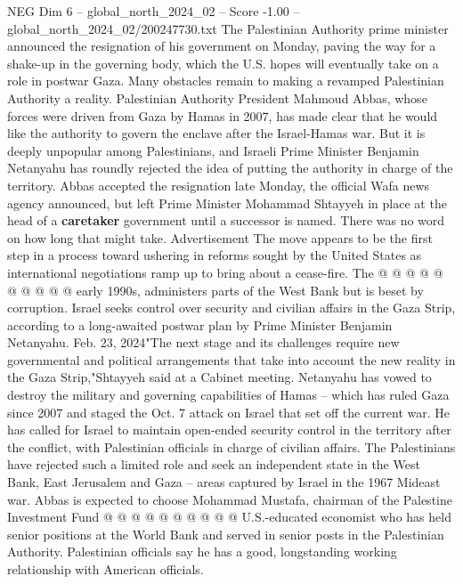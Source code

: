 \begin{textsample}{NEG Dim 6 – global\_north\_2024\_02 – Score -1.00 – global\_north\_2024\_02/200247730.txt}  \label{ex:f6_neg_280}
The Palestinian Authority prime minister announced the resignation of his government on Monday, paving the way for a shake-up in the governing body, which the U.S. hopes will eventually take on a role in postwar Gaza.
Many obstacles remain to making a revamped Palestinian Authority a reality.
Palestinian Authority President Mahmoud Abbas, whose forces were driven from Gaza by Hamas in 2007, has made clear that he would like the authority to govern the enclave after the Israel-Hamas war.
But it is deeply unpopular among Palestinians, and Israeli Prime Minister Benjamin Netanyahu has roundly rejected the idea of putting the authority in charge of the territory.
Abbas accepted the resignation late Monday, the official Wafa news agency announced, but left Prime Minister Mohammad Shtayyeh in place at the head of a \textbf{caretaker} government until a successor is named.
There was no word on how long that might take.
Advertisement The move appears to be the first step in a process toward ushering in reforms sought by the United States as international negotiations ramp up to bring about a cease-fire.
The @ @ @ @ @ @ @ @ @ @ early 1990s, administers parts of the West Bank but is beset by corruption.
Israel seeks control over security and civilian affairs in the Gaza Strip, according to a long-awaited postwar plan by Prime Minister Benjamin Netanyahu.
Feb. 23, 2024"The next stage and its challenges require new governmental and political arrangements that take into account the new reality in the Gaza Strip,"Shtayyeh said at a Cabinet meeting.
Netanyahu has vowed to destroy the military and governing capabilities of Hamas -- which has ruled Gaza since 2007 and staged the Oct. 7 attack on Israel that set off the current war.
He has called for Israel to maintain open-ended security control in the territory after the conflict, with Palestinian officials in charge of civilian affairs.
The Palestinians have rejected such a limited role and seek an independent state in the West Bank, East Jerusalem and Gaza -- areas captured by Israel in the 1967 Mideast war.
Abbas is expected to choose Mohammad Mustafa, chairman of the Palestine Investment Fund @ @ @ @ @ @ @ @ @ @ U.S.-educated economist who has held senior positions at the World Bank and served in senior posts in the Palestinian Authority.
Palestinian officials say he has a good, longstanding working relationship with American officials.

\end{textsample}
